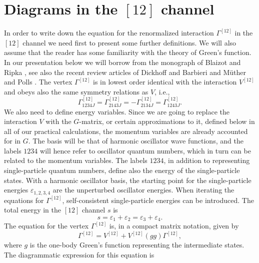 \documentclass[twoside,12pt]{article}
\begin{document}
\section{Diagrams in the $[12]$ channel}
\label{sec:sec3}


In order to write down the equation for the renormalized
interaction $\Gamma^{[12]}$ in the
$[12]$ channel we need first to present some further definitions.
We will also assume that the reader has some familiarity with the theory
of Green's function. In our presentation below we will
borrow from the monograph of Blaizot and Ripka \cite{br86}, see also the recent review 
articles of Dickhoff and Barbieri \cite{db04} and M\"uther and Polls \cite{mp00}.
The vertex $\Gamma^{[12]}$ is in lowest order identical with the
interaction $V^{[12]}$ and obeys also the same symmetry relations
as $V$, i.e.,
\begin{equation}
     \Gamma^{[12]}_{1234J}=\Gamma^{[12]}_{2143J}=-\Gamma^{[12]}_{2134J}=
     \Gamma^{[12]}_{1243J}.
     \label{eq:symproperties}
\end{equation}
We also need to define energy variables. Since we are going to
replace the interaction $V$ with the $G$-matrix, or certain
approximations to it,  defined below in all
of our practical calculations, the momentum variables are already
accounted for in $G$. The basis will be that of harmonic oscillator
wave functions, and the labels $1234$ will hence refer to oscillator
quantum numbers, which in turn can be related to the momentum
variables. The labels $1234$, in addition to representing
single-particle quantum numbers, define also the energy of the single-particle
states. With a harmonic oscillator basis, the starting point for the
single-particle energies $\varepsilon_{1,2,3,4}$ are the unperturbed
oscillator energies. When iterating the equations for $\Gamma^{[12]}$,
self-consistent single-particle energies can be introduced.
The total energy in the $[12]$ channel $s$ is
\begin{equation}
    s=\varepsilon_1+\varepsilon_2=\varepsilon_3+\varepsilon_4.
    \label{eq:energy12}
\end{equation}
The equation for the vertex $\Gamma^{[12]}$ is,
in a compact matrix notation, given by \cite{br86}
\begin{equation}
     \Gamma^{[12]}=V^{[12]}+V^{[12]}(gg)\Gamma^{[12]},
     \label{eq:schematic12}
\end{equation}
where $g$ is the one-body Green's function representing
the intermediate states.
The diagrammatic expression for this equation is
\end{document}

